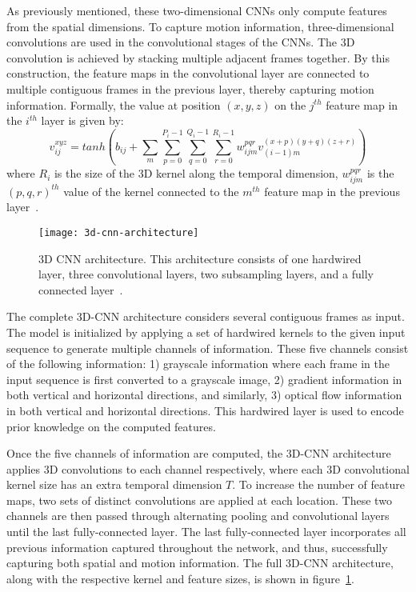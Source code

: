 As previously mentioned, these two-dimensional CNNs only compute features from the spatial dimensions. To capture motion information, three-dimensional convolutions are used in the convolutional stages of the CNNs. The 3D convolution is achieved by stacking multiple adjacent frames together. By this construction, the feature maps in the convolutional layer are connected to multiple contiguous frames in the previous layer, thereby capturing motion information. Formally, the value at position $(x,y,z)$ on the $j^{th}$ feature map in the $i^{th}$ layer is given by:
\begin{equation}
  v_{ij}^{xyz} = tanh \left( b_{ij} + \sum_{m}\sum_{p=0}^{P_i-1}\sum_{q=0}^{Q_i-1}\sum_{r=0}^{R_i-1} w_{ijm}^{pqr} v_{(i-1)m}^{(x+p)(y+q)(z+r)} \right)
\end{equation}
where $R_i$ is the size of the 3D kernel along the temporal dimension, $w_{ijm}^{pqr}$ is the $(p,q,r)^{th}$ value of the kernel connected to the $m^{th}$ feature map in the previous layer~\cite{3D-CNN:2013}.

\begin{figure}
  \centering
    \texttt{[image: 3d-cnn-architecture]}
    \caption{3D CNN architecture. This architecture consists of one hardwired layer, three convolutional layers, two subsampling layers, and a fully connected layer~\cite{3D-CNN:2013}.}
    \label{fig:3D-CNN-architecture}
\end{figure}

The complete 3D-CNN architecture considers several contiguous frames as input. The model is initialized by applying a set of hardwired kernels to the given input sequence to generate multiple channels of information. These five channels consist of the following information: 1) grayscale information where each frame in the input sequence is first converted to a grayscale image, 2) gradient information in both vertical and horizontal directions, and similarly, 3) optical flow information in both vertical and horizontal directions. This hardwired layer is used to encode prior knowledge on the computed features.

Once the five channels of information are computed, the 3D-CNN architecture applies 3D convolutions to each channel respectively, where each 3D convolutional kernel size has an extra temporal dimension $T$. To increase the number of feature maps, two sets of distinct convolutions are applied at each location. These two channels are then passed through alternating pooling and convolutional layers until the last fully-connected layer. The last fully-connected layer incorporates all previous information captured throughout the network, and thus, successfully capturing both spatial and motion information. The full 3D-CNN architecture, along with the respective kernel and feature sizes, is shown in figure~\ref{fig:3D-CNN-architecture}. 

